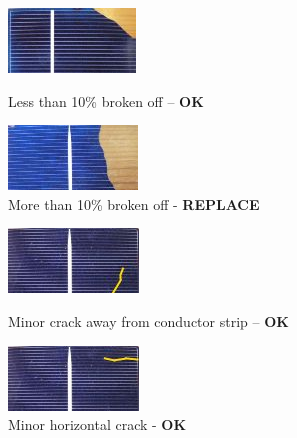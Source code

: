 \documentclass{article}
\theoremstyle{definition}
\theoremstyle{definition}
\theoremstyle{remark}
\begin{document}
    \begin{figure}[!ht]
      \begin{minipage}{0.45\textwidth}
          \centering
          \includegraphics[]{../Images/image_3_13_(less_than_10_percent).png}
          \caption*{Less than 10\% broken off – \textbf{OK}}
      \end{minipage}\hfill
      \begin{minipage}{0.45\textwidth}
          \centering
          \includegraphics[]{../Images/image_3_14_(more_than_10_percent).png}
          \caption*{More than 10\% broken off - \textbf{REPLACE}}
      \end{minipage}
    \end{figure}

    \begin{figure}[!ht]
      \begin{minipage}{0.45\textwidth}
          \centering
          \includegraphics[]{../Images/image_3_15_(minor_crack_away_from_strip).png}
          \caption*{Minor crack away from conductor strip – \textbf{OK}}
      \end{minipage}\hfill
      \begin{minipage}{0.45\textwidth}
          \centering
          \includegraphics[]{../Images/image_3_16_(minor_horizontal_crack).png}
          \caption*{Minor horizontal crack - \textbf{OK}}
      \end{minipage}
    \end{figure}
\end{document}
